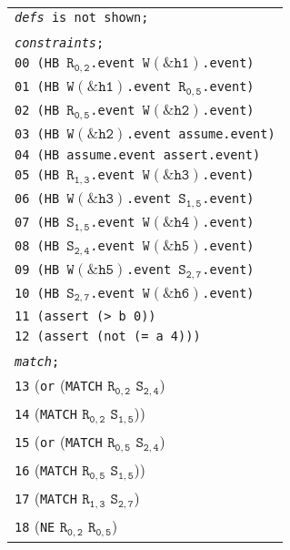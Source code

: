 \newsavebox{\boxSMTc}
\begin{lrbox}{\boxSMTc}
\begin{minipage}[c]{0.4\linewidth}
\begin{tabular}[t]{l}
\texttt{\textit{defs} is not shown;}\\
\\
\texttt{\textit{constraints};}\\
\texttt{00 (HB $\mathtt{R_{0,2}}$.event $\mathtt{W(\&h1)}$.event)}\\
\texttt{01 (HB $\mathtt{W(\&h1)}$.event $\mathtt{R_{0,5}}$.event)}\\
\texttt{02 (HB $\mathtt{R_{0,5}}$.event $\mathtt{W(\&h2)}$.event)}\\
\texttt{03 (HB $\mathtt{W(\&h2)}$.event assume.event)}\\
\texttt{04 (HB assume.event assert.event)}\\
\texttt{05 (HB $\mathtt{R_{1,3}}$.event $\mathtt{W(\&h3)}$.event)}\\
\texttt{06 (HB $\mathtt{W(\&h3)}$.event $\mathtt{S_{1,5}}$.event)}\\
\texttt{07 (HB $\mathtt{S_{1,5}}$.event $\mathtt{W(\&h4)}$.event)}\\
\texttt{08 (HB $\mathtt{S_{2,4}}$.event $\mathtt{W(\&h5)}$.event)}\\
\texttt{09 (HB $\mathtt{W(\&h5)}$.event $\mathtt{S_{2,7}}$.event)}\\
\texttt{10 (HB $\mathtt{S_{2,7}}$.event $\mathtt{W(\&h6)}$.event)}\\
\texttt{11 (assert (> b 0))}\\
\texttt{12 (assert (not (= a 4)))}\\
\\
\texttt{\textit{match};}\\
\texttt{13} (\texttt{or} (\texttt{MATCH} $\mathtt{R_{0,2}}$ $\mathtt{S_{2,4}}$)\\
\texttt{14}     (\texttt{MATCH} $\mathtt{R_{0,2}}$ $\mathtt{S_{1,5}}$))\\
\texttt{15} (\texttt{or} (\texttt{MATCH} $\mathtt{R_{0,5}}$ $\mathtt{S_{2,4}}$)\\
\texttt{16}     (\texttt{MATCH} $\mathtt{R_{0,5}}$ $\mathtt{S_{1,5}}$))\\
\texttt{17} (\texttt{MATCH} $\mathtt{R_{1,3}}$ $\mathtt{S_{2,7}}$)\\
\texttt{18} (\texttt{NE} $\mathtt{R_{0,2}}$ $\mathtt{R_{0,5}}$)\\

\end{tabular}
\end{minipage}
\end{lrbox}




